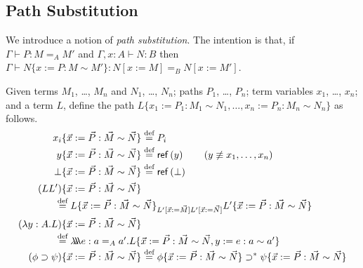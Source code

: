 
\subsection{Path Substitution}

We introduce a notion of \emph{path substitution}.  The intention is that, if
$\Gamma \vdash P : M =_A M'$ and $\Gamma, x : A \vdash N : B$ then $\Gamma \vdash N \{ x := P : M \sim M' \} : N [ x:= M ] =_B N [ x := M' ]$.

\begin{definition}
Given terms $M_1$, \ldots, $M_n$ and $N_1$, \ldots, $N_n$; paths $P_1$, \ldots, $P_n$; term variables $x_1$, \ldots, $x_n$; and a term $L$, define the path $L \{ x_1 := P_1 : M_1 \sim N_1 , \ldots, x_n := P_n : M_n \sim N_n \}$ as follows.
\begin{align*}
x_i \{ \vec{x} := \vec{P} : \vec{M} \sim \vec{N} \} & \eqdef P_i \\
y \{ \vec{x} := \vec{P} : \vec{M} \sim \vec{N} \} & \eqdef \reff{y} \qquad (y \not\equiv x_1, \ldots, x_n) \\
\bot \{ \vec{x} := \vec{P} : \vec{M} \sim \vec{N} \} & \eqdef \reff{\bot} \\
(LL') \{ \vec{x} := \vec{P} : \vec{M} \sim \vec{N} \} \\
\omit\rlap{\qquad \qquad $\eqdef L \{ \vec{x} := \vec{P} : \vec{M} \sim \vec{N} \}_{L' [\vec{x} := \vec{M}] L' [\vec{x} := \vec{N}]} L' \{ \vec{x} := \vec{P} : \vec{M} \sim \vec{N} \}$} \\
(\lambda y:A.L) \{ \vec{x} := \vec{P} : \vec{M} \sim \vec{N} \} & \\
\omit\rlap{\qquad\qquad $\eqdef \triplelambda e : a =_A a' . L \{ \vec{x} := \vec{P} : \vec{M} \sim \vec{N} , y := e : a \sim a' \}$} \\
(\phi \supset \psi) \{ \vec{x} := \vec{P} : \vec{M} \sim \vec{N} \} & \eqdef \phi \{ \vec{x} := \vec{P} : \vec{M} \sim \vec{N} \} \supset^* \psi \{ \vec{x} := \vec{P} : \vec{M} \sim \vec{N} \}
\end{align*}
\end{definition}

